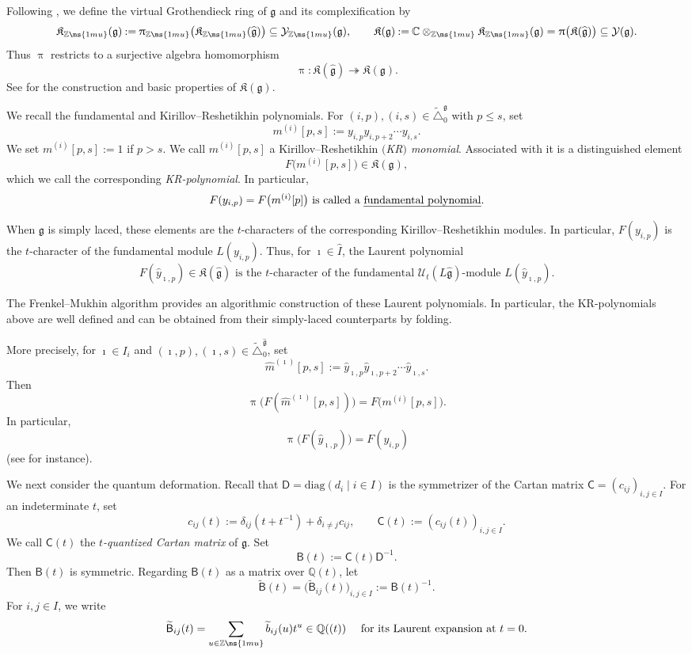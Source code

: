 \documentclass[12pt, leqno]{amsart}
\numberwithin{equation}{section}
\theoremstyle{plain}
\theoremstyle{definition}
\renewcommand{\le}{\leqslant}
\newcommand{\seteq}{\mathbin{:=}}
\newcommand{\g}{\mathfrak{g}}
\newcommand{\C}{\mathbb{C}}
\newcommand{\Q}{\mathbb{Q}}
\newcommand{\Z}{\mathbb{Z}\ms{1mu}}
\newcommand{\Dynkin}{\triangle}
\newcommand{\im}{\imath}
\newcommand{\tb}{\widetilde{b}}
\newcommand{\hI}{\widehat{I}}
\newcommand{\hg}{{\widehat{\g}}}
\newcommand{\hy}{\widehat{y}}
\newcommand{\frakK}{\mathfrak{K}}
\newcommand{\sfB}{\mathsf{B}}
\newcommand{\sfC}{\mathsf{C}}
\newcommand{\sfD}{\mathsf{D}}
\newcommand{\tsfB}{\widetilde{\sfB}}
\newcommand{\calU}{\mathcal{U}}
\newcommand{\calY}{\mathcal{Y}}
\newcommand{\tDynkin}{{\widetilde{\Dynkin}}}
\newcommand{\diag}{\mathrm{diag}}
\begin{document}
Following \cite{JLO1}, we define the virtual Grothendieck ring of
$\g$ and its complexification by
\[
\frakK_{\Z}(\g) \seteq \uppi_{\Z}\bigl(\frakK_{\Z}(\hg)\bigr)
\subseteq \calY_{\Z}(\g),
\qquad
\frakK(\g) \seteq \C\otimes_{\Z}\frakK_{\Z}(\g)
=\uppi\bigl(\frakK(\hg)\bigr) \subseteq \calY(\g).
\]
Thus $\uppi$ restricts to a surjective algebra homomorphism
\[
\uppi: \frakK(\hg)\twoheadrightarrow\frakK(\g).
\]
 See \cite{JLO1} for the construction and basic properties of $\frakK(\g)$.{}

We recall the fundamental and Kirillov--Reshetikhin
polynomials.  For $(i,p),(i,s)\in\tDynkin_0^\g$ with $p\le s$, set
\[
m^{(i)}[p,s] \seteq y_{i,p}y_{i,p+2}\cdots y_{i,s}.
\]
We set $m^{(i)}[p,s] \seteq 1$ if $p>s$. We call $m^{(i)}[p,s]$ a Kirillov--Reshetikhin \emph{$($KR$)$ monomial}.
Associated with it is a distinguished element
\[
F\bigl(m^{(i)}[p,s]\bigr)\in\frakK(\g),
\]
which we call the corresponding \emph{KR-polynomial}.  In particular,
\[
F(y_{i,p}) = F\bigl(m^{(i)}[p]\bigr) \text{ is called a \emph{fundamental polynomial}.}
\]

When $\g$ is simply laced, these elements are the $t$-characters of
the corresponding Kirillov--Reshetikhin modules.  In particular,
$F(y_{i,p})$ is the $t$-character of the fundamental module
$L(y_{i,p})$. Thus, for $\im\in\hI$, the Laurent polynomial
\[
F(\hy_{\im,p})\in\frakK(\hg) \text{ is the $t$-character of the fundamental $\calU_t(L\hg)$-module $L(\hy_{\im,p})$.}
\]

The Frenkel--Mukhin algorithm provides an algorithmic construction of
these Laurent polynomials. In particular, the KR-polynomials above are
well defined and can be obtained from their simply-laced counterparts
by folding.

More precisely, for $\im\in I_i$ and
$(\im,p),(\im,s)\in\tDynkin_0^\hg$, set
\[
\widehat{m}^{(\im)}[p,s] \seteq \hy_{\im,p}\hy_{\im,p+2}\cdots\hy_{\im,s}.
\]
Then
\[
\uppi\bigl(F(\widehat{m}^{(\im)}[p,s])\bigr) = F\bigl(m^{(i)}[p,s]\bigr).
\]
In particular,
\[
\uppi\bigl(F(\hy_{\im,p})\bigr) = F(y_{i,p})
\]
(see \cite[Corollary~3.10 and Remark~5.40]{JLO1} for instance).

We next consider the quantum deformation.  Recall that
$\sfD=\diag(d_i\mid i\in I)$ is the symmetrizer of the Cartan matrix
$\sfC=(c_{ij})_{i,j\in I}$.  For an indeterminate $t$, set
\[
c_{ij}(t) \seteq \delta_{ij}(t+t^{-1})+\delta_{i\ne j}c_{ij},
\qquad \sfC(t)\seteq(c_{ij}(t))_{i,j\in I}.
\]
We call $\sfC(t)$ the \emph{$t$-quantized Cartan matrix} of $\g$.
Set
\[
\sfB(t)\seteq \sfC(t)\sfD^{-1}.
\]
Then $\sfB(t)$ is symmetric.  Regarding $\sfB(t)$ as a matrix over
$\Q(t)$, let
\[
\tsfB(t) = \bigl(\tsfB_{ij}(t)\bigr)_{i,j\in I} \seteq \sfB(t)^{-1}.
\]
For $i,j\in I$, we write
\[
\tsfB_{ij}(t) = \sum_{u\in\Z}\tb_{ij}(u)t^u \in\Q((t)) \quad \text{ for its Laurent expansion at $t=0$.}
\]
\end{document}
